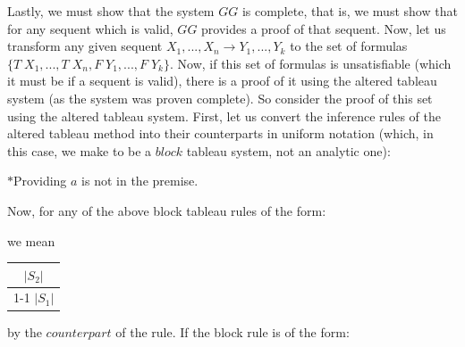 \documentclass{article}
\theoremstyle{definition}
\begin{document}
Lastly, we must show that the system $GG$ is complete, that is, we must show that for any sequent which is valid, $GG$ provides a proof of that sequent. Now, let us transform 
any given sequent $X_1,...,X_n\rightarrow Y_1,...,Y_k$ to the set of formulas $\{ T\; X_1,...,T\; X_n,F\; Y_1,...,F\; Y_k\}$. Now, if this set of formulas is unsatisfiable (which it must 
be if a sequent is valid), there is a proof of it using the altered tableau system (as the system was proven complete). So consider the proof of this set using the altered tableau system.
First, let us convert the inference rules of the altered tableau method into their counterparts in uniform notation (which, in this case, we make to be 
a $block$ tableau system, not an analytic one):\newline
\begin{center}
\end{center}
\begin{flushright}
$*$Providing $a$ is not in the premise.
\end{flushright}
Now, for any of the above block tableau rules of the form:
\begin{center}
\end{center}
we mean
\renewcommand\arraystretch{2.4}
\begin{center}
\begin{tabular}{c}
	$|S_2|$ \\
	\cline{1-1}
	$|S_1|$
\end{tabular}
\end{center}
by the $counterpart$ of the rule. If the block rule is of the form:
\begin{center}
\end{center}
\end{document}
